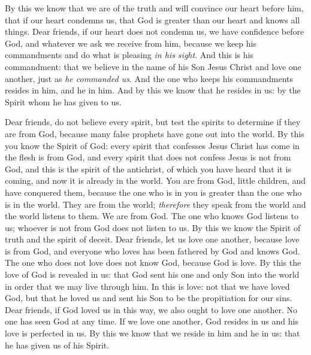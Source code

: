 \begin{biblechapter}
\verse By this we know that we are of the truth and will convince our heart before him,
\verse that if our heart condemns us, that God is greater than our heart and knows all things.
\verse Dear friends, if our heart does not condemn us, we have confidence before God,
\verse and whatever we ask we receive from him, because we keep his commandments and do what is pleasing \textit{in his sight}.
\verse And this is his commandment: that we believe in the name of his Son Jesus Christ and love one another, just as \textit{he commanded us}.
\verse And the one who keeps his commandments resides in him, and he in him. And by this we know that he resides in us: by the Spirit whom he has given to us.
\end{biblechapter}

\begin{biblechapter} %
 Dear friends, do not believe every spirit, but test the spirits to determine if they are from God, because many false prophets have gone out into the world.
\verse By this you know the Spirit of God: every spirit that confesses Jesus Christ has come in the flesh is from God,
\verse and every spirit that does not confess Jesus is not from God, and this is the spirit of the antichrist, of which you have heard that it is coming, and now it is already in the world.
\verse You are from God, little children, and have conquered them, because the one who is in you is greater than the one who is in the world.
\verse They are from the world; \textit{therefore} they speak from the world and the world listens to them.
\verse We are from God. The one who knows God listens to us; whoever is not from God does not listen to us. By this we know the Spirit of truth and the spirit of deceit.
 Dear friends, let us love one another, because love is from God, and everyone who loves has been fathered by God and knows God.
\verse The one who does not love does not know God, because God is love.
\verse By this the love of God is revealed in us: that God sent his one and only Son into the world in order that we may live through him.
\verse In this is love: not that we have loved God, but that he loved us and sent his Son to be the propitiation for our sins.
\verse Dear friends, if God loved us in this way, we also ought to love one another.
\verse No one has seen God at any time. If we love one another, God resides in us and his love is perfected in us.
\verse By this we know that we reside in him and he in us: that he has given us of his Spirit.

\end{biblechapter}
